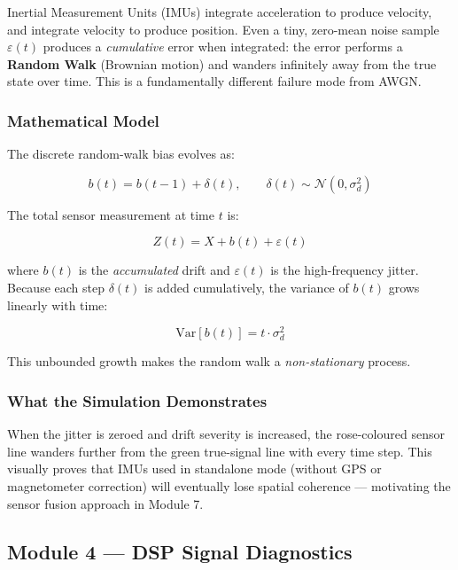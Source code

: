 \documentclass[12pt, a4paper]{article}
\begin{document}
Inertial Measurement Units (IMUs) integrate acceleration to produce velocity, and
integrate velocity to produce position. Even a tiny, zero-mean noise sample
$\varepsilon(t)$ produces a \emph{cumulative} error when integrated: the error
performs a \textbf{Random Walk} (Brownian motion) and wanders infinitely away from the
true state over time. This is a fundamentally different failure mode from AWGN.

\subsubsection{Mathematical Model}

The discrete random-walk bias evolves as:

\begin{equation}
  b(t) = b(t-1) + \delta(t), \qquad \delta(t) \sim \mathcal{N}(0, \sigma_d^2)
  \label{eq:randomwalk}
\end{equation}

The total sensor measurement at time $t$ is:

\begin{equation}
  Z(t) = X + b(t) + \varepsilon(t)
\end{equation}

where $b(t)$ is the \emph{accumulated} drift and $\varepsilon(t)$ is the high-frequency
jitter. Because each step $\delta(t)$ is added cumulatively, the variance of $b(t)$
grows linearly with time:

\begin{equation}
  \text{Var}[b(t)] = t \cdot \sigma_d^2
\end{equation}

This unbounded growth makes the random walk a \emph{non-stationary} process.

\subsubsection{What the Simulation Demonstrates}

When the jitter is zeroed and drift severity is increased, the rose-coloured sensor
line wanders further from the green true-signal line with every time step. This
visually proves that IMUs used in standalone mode (without GPS or magnetometer
correction) will eventually lose spatial coherence --- motivating the sensor fusion
approach in Module 7.

\subsection{Module 4 --- DSP Signal Diagnostics}
\end{document}
